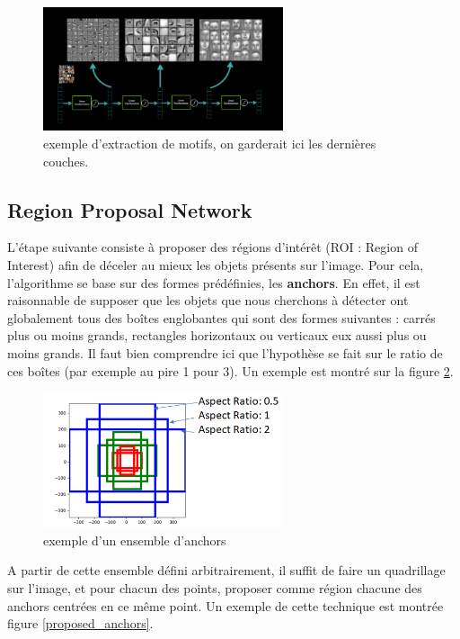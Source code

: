 \begin{figure}[!h]
\centering
\includegraphics[width=200pt]{images/Mask_R_CNN/resnet_extraction.png} 
\caption{exemple d'extraction de motifs, on garderait ici les dernières couches.}
\label{resnet_extraction}
\end{figure}

\subsection{Region Proposal Network}

L'étape suivante consiste à proposer des régions d'intérêt (ROI : Region of Interest) afin de déceler au mieux les objets présents sur l'image. Pour cela, l'algorithme se base sur des formes prédéfinies, les \textbf{anchors}. En effet, il est raisonnable de supposer que les objets que nous cherchons à détecter ont globalement tous des boîtes englobantes qui sont des formes suivantes : carrés plus ou moins grands, rectangles horizontaux ou verticaux eux aussi plus ou moins grands. Il faut bien comprendre ici que l'hypothèse se fait sur le ratio de ces boîtes (par exemple au pire 1 pour 3). Un exemple est montré sur la figure \ref{anchors}.

\begin{figure}[!h]
\centering
\includegraphics[width=200pt]{images/Mask_R_CNN/anchors.png} 
\caption{exemple d'un ensemble d'anchors}
\label{anchors}
\end{figure}

A partir de cette ensemble défini arbitrairement, il suffit de faire un quadrillage sur l'image, et pour chacun des points, proposer comme région chacune des anchors centrées en ce même point. Un exemple de cette technique est montrée figure \ref{proposed_anchors}.

